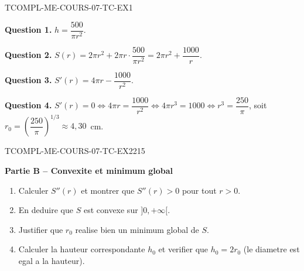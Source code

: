\begin{corrige}{TCOMPL-ME-COURS-07-TC-EX1}

\textbf{Question 1.} $h = \dfrac{500}{\pi r^2}$.

\textbf{Question 2.} $S(r) = 2\pi r^2 + 2\pi r \cdot \dfrac{500}{\pi r^2} = 2\pi r^2 + \dfrac{1000}{r}$.


\textbf{Question 3.} $S'(r) = 4\pi r - \dfrac{1000}{r^2}$.

\textbf{Question 4.} $S'(r) = 0 \iff 4\pi r = \dfrac{1000}{r^2} \iff 4\pi r^3 = 1000 \iff r^3 = \dfrac{250}{\pi}$, soit $r_0 = \left(\dfrac{250}{\pi}\right)^{1/3} \approx 4{,}30$~cm.

\end{corrige}

\bigskip


\begin{exercice}{TCOMPL-ME-COURS-07-TC-EX2}{2}{15}

\textbf{Partie B -- Convexite et minimum global}

\begin{enumerate}
  \item Calculer $S''(r)$ et montrer que $S''(r) > 0$ pour tout $r > 0$.
  \item En deduire que $S$ est convexe sur $]0, +\infty[$.
  \item Justifier que $r_0$ realise bien un minimum global de $S$.
  \item Calculer la hauteur correspondante $h_0$ et verifier que $h_0 = 2r_0$ (le diametre est egal a la hauteur).
\end{enumerate}

\end{exercice}

